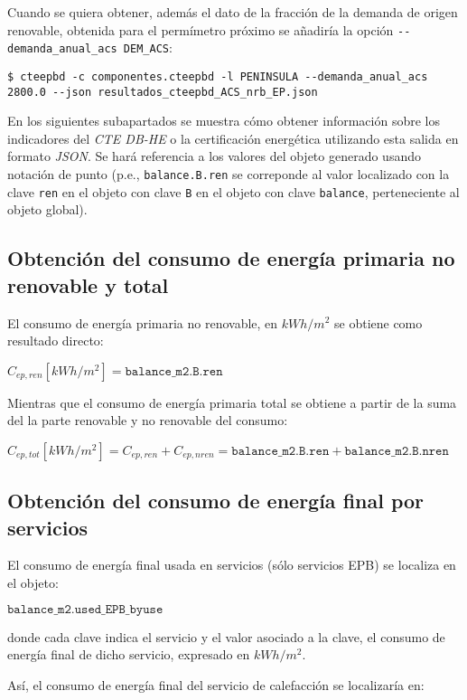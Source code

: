 \documentclass[10pt,notitlepage,oneside,a4paper]{article}
\begin{document}
Cuando se quiera obtener, además el dato de la fracción de la demanda de origen renovable, obtenida para el permímetro próximo se añadiría la opción \texttt{-{}-demanda\_anual\_acs DEM\_ACS}:

\begin{Verbatim}[fontsize=\small]
    $ cteepbd -c componentes.cteepbd -l PENINSULA --demanda_anual_acs 2800.0 --json resultados_cteepbd_ACS_nrb_EP.json
\end{Verbatim}

En los siguientes subapartados se muestra cómo obtener información sobre los indicadores del \textit{CTE DB-HE} o la certificación energética utilizando esta salida en formato \textit{JSON}. Se hará referencia a los valores del objeto generado usando notación de punto (p.e., \texttt{balance.B.ren} se correponde al valor localizado con la clave \texttt{ren} en el objeto con clave \texttt{B} en el objeto con clave \texttt{balance}, perteneciente al objeto global).

\subsection{Obtención del consumo de energía primaria no renovable y total}

El consumo de energía primaria no renovable, en $kWh/m^2$ se obtiene como resultado directo:

$C_{ep,ren} [kWh/m^2] = \texttt{balance\_m2.B.ren}$

Mientras que el consumo de energía primaria total se obtiene a partir de la suma del la parte renovable y no renovable del consumo:

$C_{ep,tot} [kWh/m^2] = C_{ep,ren} + C_{ep,nren} = \texttt{balance\_m2.B.ren} + \texttt{balance\_m2.B.nren}$

\subsection{Obtención del consumo de energía final por servicios}

El consumo de energía final usada en servicios (sólo servicios EPB) se localiza en el objeto:

$\texttt{balance\_m2.used\_EPB\_byuse}$

donde cada clave indica el servicio y el valor asociado a la clave, el consumo de energía final de dicho servicio, expresado en $kWh/m^2$.

Así, el consumo de energía final del servicio de calefacción se localizaría en:
\end{document}
